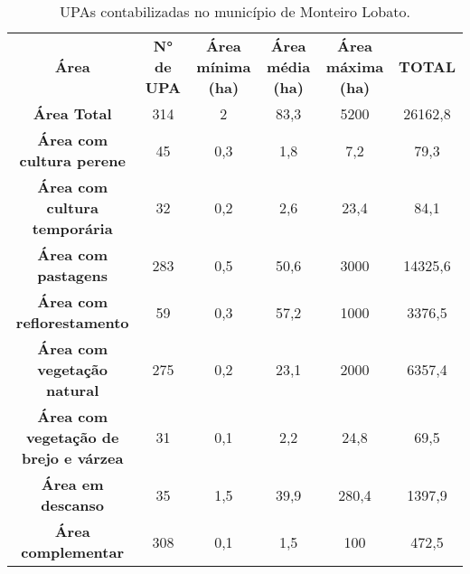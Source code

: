 \begin{table}[htbp]
  \centering
  \caption{UPAs contabilizadas no município de Monteiro Lobato.}
    \begin{tabular}{c|c|c|c|c|c}
    \rowcolor[rgb]{ .969,  .588,  .275} \textcolor[rgb]{ 1,  1,  1}{\textbf{Área}} & \multicolumn{1}{P{4em}|}{\textcolor[rgb]{ 1,  1,  1}{\textbf{N° de UPA}}} & \multicolumn{1}{P{4em}|}{\textcolor[rgb]{ 1,  1,  1}{\textbf{Área mínima (ha)}}} & \multicolumn{1}{P{4em}|}{\textcolor[rgb]{ 1,  1,  1}{\textbf{Área média (ha)}}} & \multicolumn{1}{P{4em}|}{\textcolor[rgb]{ 1,  1,  1}{\textbf{Área máxima (ha)}}} & \multicolumn{1}{P{4em}}{\textcolor[rgb]{ 1,  1,  1}{\textbf{TOTAL}}} \\
    \rowcolor[rgb]{ .992,  .914,  .851} \textbf{Área Total} & 314   & 2     & 83,3  & 5200  & 26162,8 \\
    \rowcolor[rgb]{ .984,  .831,  .706} \textbf{Área com cultura perene} & 45    & 0,3   & 1,8   & 7,2   & 79,3 \\
    \rowcolor[rgb]{ .992,  .914,  .851} \textbf{Área com cultura temporária} & 32    & 0,2   & 2,6   & 23,4  & 84,1 \\
    \rowcolor[rgb]{ .984,  .831,  .706} \textbf{Área com pastagens} & 283   & 0,5   & 50,6  & 3000  & 14325,6 \\
    \rowcolor[rgb]{ .992,  .914,  .851} \textbf{Área com reflorestamento} & 59    & 0,3   & 57,2  & 1000  & 3376,5 \\
    \rowcolor[rgb]{ .984,  .831,  .706} \textbf{Área com vegetação natural} & 275   & 0,2   & 23,1  & 2000  & 6357,4 \\
    \rowcolor[rgb]{ .992,  .914,  .851} \textbf{Área com vegetação de brejo e várzea} & 31    & 0,1   & 2,2   & 24,8  & 69,5 \\
    \rowcolor[rgb]{ .984,  .831,  .706} \textbf{Área em descanso} & 35    & 1,5   & 39,9  & 280,4 & 1397,9 \\
    \rowcolor[rgb]{ .992,  .914,  .851} \textbf{Área complementar} & 308   & 0,1   & 1,5   & 100   & 472,5 \\
    \end{tabular}%
  \label{tab:upas}%
\end{table}%
